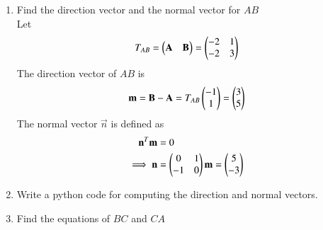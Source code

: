 \documentclass[journal,12pt,twocolumn]{IEEEtran}
\renewcommand\thesection{\arabic{section}}
\begin{document}
\begin{enumerate}[label=\thesection.\arabic*
,ref=\thesection.\theenumi]
\begin{align}
\\
&= -\myvec{2\\2}+ \lambda_1\myvec{3\\5}
\end{align}
%
Alternatively, the desired equation is
\begin{align}
\label{eq:line_norm}
\myvec{5&-3}\brak{\vec{x} - \vec{A}}&= 0
\\
\implies \myvec{5&-3}\vec{x} = -\myvec{5&-3}\myvec{2\\2} = -4
\end{align}
%
\item Find the direction vector and the normal vector for $AB$
\\
\solution Let
\begin{align}
T_{AB} = \begin{pmatrix}\mathbf{A} & \mathbf{B}\end{pmatrix} = \begin{pmatrix}-2 & 1\\ -2 & 3\end{pmatrix}
\end{align}
The direction vector of $AB$ is 
\begin{equation}
\label{eq:dir_vec}
\mathbf{m} = \mathbf{B}-\mathbf{A} = T_{AB} \begin{pmatrix}-1 \\ 1\end{pmatrix} = \begin{pmatrix}3\\5\end{pmatrix}
\end{equation}
%
The normal vector $\vec{n}$ is defined as
\begin{align}
\label{eq:line_nor}
\mathbf{n}^T\mathbf{m} &= 0
\\
\implies \mathbf{n}&= \begin{pmatrix}0 & 1 \\ -1 & 0\end{pmatrix}\mathbf{m} = \begin{pmatrix}5\\-3\end{pmatrix}
\end{align}
%
\item Write a python code for computing the direction and normal vectors.
%
\label{prob:line_eq}

\item
%
Find the equations of $BC$ and $CA$
\end{enumerate}
\end{document}
